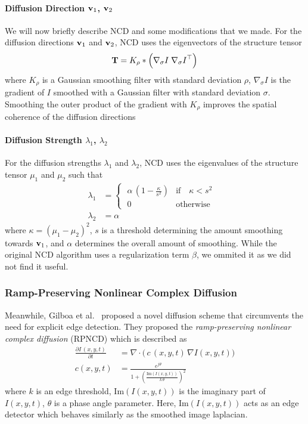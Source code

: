\paragraph{Diffusion Direction \(\mathbf{v}_1\), \(\mathbf{v}_2\)}
We will now briefly describe NCD and some modifications that we made.
For the diffusion directions \(\mathbf{v}_1\) and \(\mathbf{v}_2\), NCD uses the eigenvectors of the structure tensor 
\begin{align}
  \mathbf{T} = K_{\rho} * \left( \nabla_{\sigma} I \; {\nabla_{\sigma} I}^{\top} \right) 
\end{align}
where \(K_{\rho}\) is a Gaussian smoothing filter with standard deviation \(\rho\), \(\nabla_{\sigma}I\) is the gradient of \(I\) smoothed with a Gaussian filter with standard deviation \(\sigma\).
Smoothing the outer product of the gradient with \(K_{\rho}\) improves the spatial coherence of the diffusion directions

\paragraph{Diffusion Strength \(\lambda_1\), \(\lambda_2\)}
For the diffusion strengths \(\lambda_1\) and \(\lambda_2\), NCD uses the eigenvalues of the structure tensor \(\mu_1\) and \(\mu_2\) such that
\begin{align}
  \lambda_1 &= \begin{cases}
    \; \alpha \, \left(1 - \frac{\kappa}{s^2}\right) &  \text{if}\quad \kappa < s^2  \\
    \; 0 & \text{otherwise}\quad
    \end{cases} \\
  \lambda_2 &= \alpha
\end{align}
where \(\kappa = {(\mu_1 - \mu_2)}^2\), \(s\) is a threshold determining the amount smoothing towards \(\mathbf{v}_1\), and \(\alpha\) determines the overall amount of smoothing.
While the original NCD algorithm uses a regularization term \(\beta\), we ommited it as we did not find it useful.

\subsubsection{Ramp-Preserving Nonlinear Complex Diffusion}
Meanwhile, Gilboa et al.~\cite{gilboa_image_2004} proposed a novel diffusion scheme that circumvents the need for explicit edge detection.
They proposed the \textit{ramp-preserving nonlinear complex diffusion} (RPNCD) which is described as
\begin{align}
  \frac{\partial  I\,(x, y, t)}{\partial t} &= \nabla \cdot \big(\, c\,(x, y, t) \, \nabla I(x, y, t) \big) \\
  c\left(x, y, t\right) &= \frac{e^{j \theta}}{ 1 + {\left( \frac{\mathrm{Im}\left(I(x, y, t)\right)}{ k \, \theta } \right)}^2}
\end{align}
where \(k\) is an edge threshold, \(\mathrm{Im}\left(I(x, y, t)\right)\) is the imaginary part of \(I(x,y,t)\), \(\theta\) is a phase angle parameter.
Here, \(\mathrm{Im}\left(I(x, y, t)\right)\) acts as an edge detector which behaves similarly as the smoothed image laplacian.


